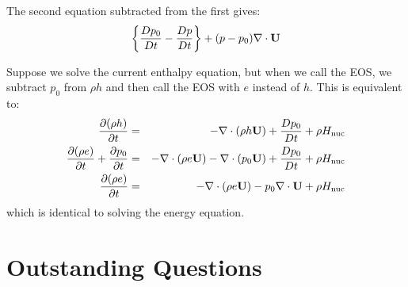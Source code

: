 The second equation subtracted from the first gives:
\begin{equation}
  \left \{ \frac{Dp_0}{Dt} - \frac{Dp}{Dt} \right \} + (p - p_0)  \nabla \cdot {\bf U}
\end{equation}

Suppose we solve the current enthalpy equation, but when we call the EOS, we 
subtract $p_0$ from $\rho h$ and then call the EOS with $e$ instead of $h$.  This is equivalent
to:
\begin{eqnarray}
\frac{\partial(\rho h)}{\partial t} &=& -\nabla\cdot(\rho h\Ub) +
  \frac{Dp_0}{Dt} + \rho\Hnuc \nonumber \\
%
\frac{\partial(\rho e)}{\partial t} + \frac{\partial p_0}{\partial t} &=&
 -\nabla\cdot(\rho e\Ub) -\nabla\cdot(p_0 \Ub) + \frac{Dp_0}{Dt} + \rho\Hnuc \nonumber \\
%
\frac{\partial(\rho e)}{\partial t} &=&
 -\nabla\cdot(\rho e\Ub) - p_0 \nabla\cdot\Ub + \rho\Hnuc  \nonumber
\end{eqnarray}
which is identical to solving the energy equation.

\section{Outstanding Questions}

